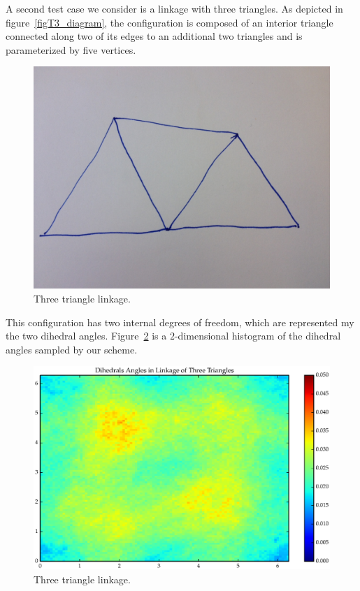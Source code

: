 A second test case we consider is a linkage with three triangles. As depicted in figure~\ref{figT3_diagram}, the configuration is composed of an interior triangle connected along two of its edges to an additional two triangles and is parameterized by five vertices. 
\begin{figure}[ht]
\centering
  \includegraphics[scale=0.2]{images/T3_diagram.eps}
\caption{Three triangle linkage.}
\label{fig:T3_diagram}
\end{figure}
This configuration has two internal degrees of freedom, which are represented my the two dihedral angles. Figure~\ref{fig:T3_1} is a $2$-dimensional histogram of the dihedral angles sampled by our scheme. 
\begin{figure}[ht]
\centering
  \includegraphics[scale=0.6]{images/T3_1_2D.eps}
\caption{Three triangle linkage.}
\label{fig:T3_1}
\end{figure}


